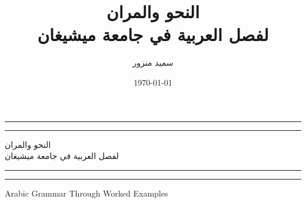 \documentclass[11pt,twoside]{book}
\title{النحو والمران\\لفصل العربية في جامعة ميشيغان}
\author{\textarabic{سميد منزور}}
\date{\today} %
\begin{document}
\frontmatter


\begin{titlepage} %

	\centering %
	
	\scshape %
	
	\vspace*{\baselineskip} %
	
	
	\rule{\textwidth}{1.6pt}\vspace*{-\baselineskip}\vspace*{2pt} %
	\rule{\textwidth}{0.4pt} %
	
	\vspace{0.75\baselineskip} %
	
	{\LARGE النحو والمران\\لفصل العربية في جامعة ميشيغان\\} %
	
	\vspace{0.75\baselineskip} %
	
	\rule{\textwidth}{0.4pt}\vspace*{-\baselineskip}\vspace{3.2pt} %
	\rule{\textwidth}{1.6pt} %
	
	\vspace{2\baselineskip} %
	
	
	\textenglish{Arabic Grammar Through Worked Examples} %
	
	\vspace*{3\baselineskip} %
	
	
	
	\vspace{0.5\baselineskip} %
	
	

\end{titlepage}
\end{document}
